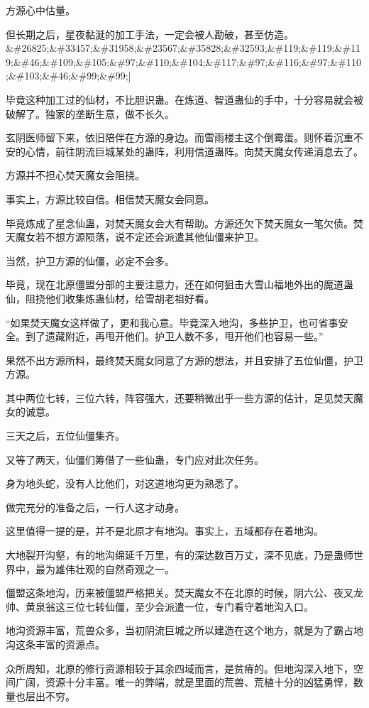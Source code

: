 \begin{this_body}
方源心中估量。

但长期之后，星夜黏涎的加工手法，一定会被人勘破，甚至仿造。\&\#26825;\&\#33457;\&\#31958;\&\#23567;\&\#35828;\&\#32593;\&\#119;\&\#119;\&\#119;\&\#46;\&\#109;\&\#105;\&\#97;\&\#110;\&\#104;\&\#117;\&\#97;\&\#116;\&\#97;\&\#110;\&\#103;\&\#46;\&\#99;\&\#99;]

毕竟这种加工过的仙材，不比胆识蛊。在炼道、智道蛊仙的手中，十分容易就会被破解了。独家的垄断生意，做不长久。

玄阴医师留下来，依旧陪伴在方源的身边。而雷雨楼主这个倒霉蛋。则怀着沉重不安的心情，前往阴流巨城某处的蛊阵，利用信道蛊阵。向焚天魔女传递消息去了。

方源并不担心焚天魔女会阻挠。

事实上，方源比较自信。相信焚天魔女会同意。

毕竟炼成了星念仙蛊，对焚天魔女会大有帮助。方源还欠下焚天魔女一笔欠债。焚天魔女若不想方源陨落，说不定还会派遣其他仙僵来护卫。

当然，护卫方源的仙僵，必定不会多。

毕竟，现在北原僵盟分部的主要注意力，还在如何狙击大雪山福地外出的魔道蛊仙，阻挠他们收集炼蛊仙材，给雪胡老祖好看。

“如果焚天魔女这样做了，更和我心意。毕竟深入地沟，多些护卫，也可省事安全。到了遗藏附近，再甩开他们。护卫人数不多，甩开他们也容易一些。”

果然不出方源所料，最终焚天魔女同意了方源的想法，并且安排了五位仙僵，护卫方源。

其中两位七转，三位六转，阵容强大，还要稍微出乎一些方源的估计，足见焚天魔女的诚意。

三天之后，五位仙僵集齐。

又等了两天，仙僵们筹借了一些仙蛊，专门应对此次任务。

身为地头蛇，没有人比他们，对这道地沟更为熟悉了。

做完充分的准备之后，一行人这才动身。

这里值得一提的是，并不是北原才有地沟。事实上，五域都存在着地沟。

大地裂开沟壑，有的地沟绵延千万里，有的深达数百万丈，深不见底，乃是蛊师世界中，最为雄伟壮观的自然奇观之一。

僵盟这条地沟，历来被僵盟严格把关。焚天魔女不在北原的时候，阴六公、夜叉龙帅、黄泉翁这三位七转仙僵，至少会派遣一位，专门看守着地沟入口。

地沟资源丰富，荒兽众多，当初阴流巨城之所以建造在这个地方，就是为了霸占地沟这条丰富的资源点。

众所周知，北原的修行资源相较于其余四域而言，是贫瘠的。但地沟深入地下，空间广阔，资源十分丰富。唯一的弊端，就是里面的荒兽、荒植十分的凶猛勇悍，数量也层出不穷。


\end{this_body}
